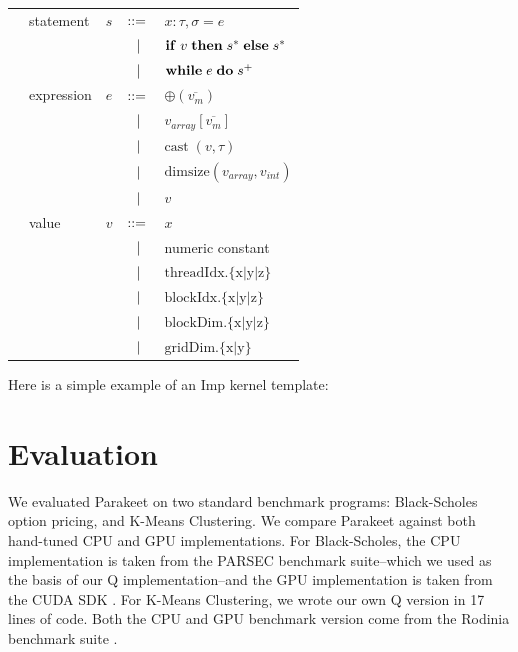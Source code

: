 \documentclass[preprint]{sigplanconf}
\begin{document}
\begin{tabular}{m{0.1cm}m{1.2cm}m{0.1cm}m{0.2cm}p{4.7cm}}
& statement         & $s$      & $::=$ & $x : \tau, \sigma = e $         \\[2pt]
&                   &          & $\ \ | \ \ $    & $\mbox{\textbf{if}} \;v\; \mbox{\textbf{then}} \;s^*\; \mbox{\textbf{else}} \;s^*$ \\[2pt]
&                   &          & $\ \ | \ \ $    & $\mbox{\textbf{while}} \;e\; \mbox{\textbf{do}} \;s^+\;  $ \\[4pt]
& expression        & $e$      & $::=$ & $\oplus(\overline{v_m})$ \\[2pt]
&                   &          & $\ \ | \ \ $    & $v_{array}[\overline{v_m}]$ \\[2pt]
&                   &          & $\ \ | \ \ $    & $\textrm{cast} \; (v, \tau)$ \\[2pt] 
&                   &          & $\ \ | \ \ $    & $\textrm{dimsize}(v_{array}, v_{int}) $ \\[2pt]
&                   &          & $\ \ | \ \ $    & $v$ \\[4pt]
& value      & $v$ & $::=$ &  $x$ \\[2pt]
&            &     & $\ \ | \ \ $    &   numeric constant \\[2pt]
&            &     & $\ \ | \ \ $    &  $\mathrm{threadIdx.\{x|y|z\}} $\\[2pt]
&            &     & $\ \ | \ \ $    &  $\mathrm{blockIdx.\{x|y|z\}} $\\[2pt]
&            &     & $\ \ | \ \ $    &  $\mathrm{blockDim.\{x|y|z\}} $\\[2pt]
&            &     & $\ \ | \ \ $    &  $\mathrm{gridDim.\{x|y\}}    $\\[2pt]
\end{tabular}
Here is a simple example of an Imp kernel template: 

\section{Evaluation}
\label{Evaluation}

We evaluated Parakeet on two standard benchmark programs: Black-Scholes option
pricing, and K-Means Clustering.  We compare Parakeet against both hand-tuned
CPU and GPU implementations.  For Black-Scholes, the CPU implementation is
taken from the PARSEC \cite{Bien08} benchmark suite--which we used as the basis
of our Q implementation--and the GPU implementation is taken from the CUDA SDK
\cite{NvidSD}.  For K-Means Clustering, we wrote our own Q version in 17 lines
of code.  Both the CPU and GPU benchmark version come from the Rodinia
benchmark suite \cite{Che09}.
\end{document}

